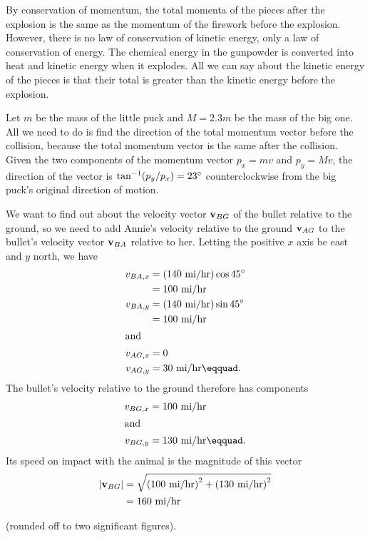 By conservation of momentum, the total momenta of the pieces
after the explosion is the same as the momentum of the firework
before the explosion. However, there is no law of conservation
of kinetic energy, only a law of conservation of energy. The chemical
energy in the gunpowder is converted into heat and kinetic energy when
it explodes. All we can say about the kinetic energy of the pieces is
that their total is greater than the kinetic energy before the
explosion.

Let $m$ be the mass of the little puck and $M=2.3m$ be
the mass of the big one. All we need to do is find the
direction of the total momentum vector before the collision,
because the total momentum vector is the same after the
collision. Given the two components of the momentum vector
$p_x=mv$ and $p_y=Mv$, the direction of the
vector is $\tan^{-1}(p_y/p_x)=23\mspace{0mu}^\circ$ counterclockwise from
the big puck's original direction of motion.

We want to find out about the velocity vector $\textbf{v}_{BG}$ of the bullet relative to the ground,
so we need to add Annie's velocity relative to the ground $\textbf{v}_{AG}$ to the bullet's velocity vector $\textbf{v}_{BA}$ relative to her. Letting the positive $x$ axis be east and $y$ north, we have
\begin{align*}
	v_{BA,x}	&= \zu{(140\ mi/hr)} \cos 45\degunit \\
			&= \zu{100\ mi/hr} \\
	v_{BA,y}	&= \zu{(140\ mi/hr)} \sin 45\degunit \\
			&= \zu{100\ mi/hr} \\
\intertext{and}
	v_{AG,x}	&= 0 \\
	v_{AG,y}	&= \zu{30\ mi/hr}\eqquad. 
\end{align*}
The bullet's velocity relative to the ground therefore has components
\begin{align*}
	v_{BG,x}	&= \zu{100\ mi/hr}   \\
\intertext{and} 
	v_{BG,y}	&= \zu{130\ mi/hr}\eqquad. \\
\end{align*}
Its speed on impact with the animal is the magnitude of this vector
\begin{align*}
	|\zb{v}_{BG}|	&=  \sqrt{\zu{(100\ mi/hr)}^2+\zu{(130\ mi/hr)}^2}\\
			&= 160\ \zu{mi/hr}
\end{align*}

(rounded off to two significant figures).

